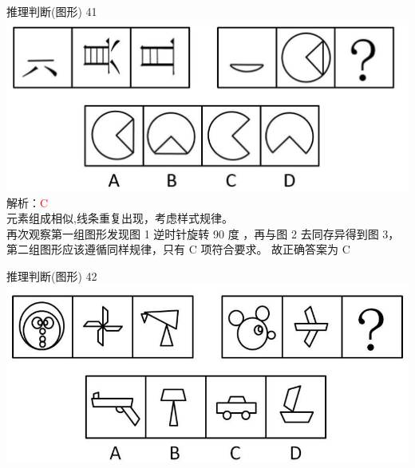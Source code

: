 \documentclass[aspectratio=169]{beamer}
\begin{document}
\begin{frame}[t]{推理判断(图形)}
    41\\
    \includegraphics[scale=0.25]{41}\\ 
    解析：\textcolor{red}{C}\\
    元素组成相似,线条重复出现，考虑样式规律。\\
    再次观察第一组图形发现图 1 逆时针旋转 90 度 ，再与图 2 去同存异得到图 3，\\
    第二组图形应该遵循同样规律，只有 C 项符合要求。
    故正确答案为 C
\end{frame}


\begin{frame}[t]{推理判断(图形)}
    42\\
    \includegraphics[scale=0.25]{42}\\ 
\end{frame}
\end{document}
